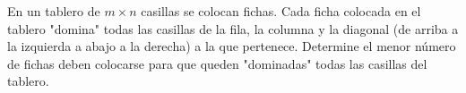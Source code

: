  En un tablero de $m \times n$ casillas se colocan fichas. Cada ficha colocada en el tablero "domina" todas las casillas de la fila, la columna y la diagonal (de arriba a la izquierda a abajo a la derecha) a la que pertenece. Determine el menor número de fichas deben colocarse para que queden "dominadas" todas las casillas del tablero. 